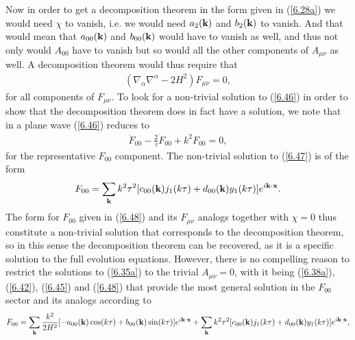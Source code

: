 \documentclass[aps,onecolumn,10pt]{revtex4}
\numberwithin{equation}{section}
\numberwithin{equation}{section}
\begin{document}
Now in order to get a decomposition theorem in the form given in (\ref{6.28a}) we would need $\chi$ to vanish, i.e. we would need $a_2({\bf k})$ and $b_2({\bf k})$ to vanish. And that would mean that $a_{00}({\bf k})$ and $b_{00}({\bf k})$ would have to vanish as well, and thus not only would $A_{00}$ have to vanish but so would all the other components of $A_{\mu\nu}$ as well. A decomposition theorem would thus require that
%
\begin{eqnarray}
(\nabla_{\alpha}\nabla^{\alpha}-2H^2)F_{\mu\nu}=0,
\label{6.46}
\end{eqnarray}
%
for all components of $F_{\mu\nu}$. To look for a non-trivial solution to (\ref{6.46}) in order to show that the decomposition theorem does in fact have a solution, we note that in a plane wave (\ref{6.46}) reduces to 
%
\begin{eqnarray}
\ddot{F}_{00}-\frac{2}{\tau}\dot{F}_{00}+k^2F_{00}=0,
\label{6.47}
\end{eqnarray}
%
for the representative $F_{00}$ component. The non-trivial solution to (\ref{6.47}) is of the form 
%
\begin{eqnarray}
F_{00}=\sum_{\bf k} k^2\tau^2[c_{00}({\bf k})j_1(k\tau)+d_{00} ({\bf k})y_1(k\tau)]e^{i{\bf k}\cdot {\bf x}}.
\label{6.48}
\end{eqnarray}
% 
The form for $F_{00}$ given in (\ref{6.48}) and its $F_{\mu\nu}$ analogs together with $\chi=0$ thus constitute a non-trivial solution that corresponds to the decomposition theorem, so in this sense the decomposition theorem can be recovered, as it is a specific solution to the full evolution equations. However, there is no compelling reason to restrict the solutions to (\ref{6.35a}) to the trivial $A_{\mu\nu}=0$, with it being (\ref{6.38a}), (\ref{6.42}), (\ref{6.45}) and (\ref{6.48}) that provide the most general solution in the $F_{00}$ sector and its analogs according to 
%
\begin{eqnarray}
F_{00}=\sum_{\bf k}\frac{k^2}{2H^2} [-a_{00}({\bf k})\cos(k\tau)+b_{00} ({\bf k})\sin(k\tau)]e^{i{\bf k}\cdot {\bf x}}+\sum_{\bf k} k^2\tau^2[c_{00}({\bf k})j_1(k\tau)+d_{00} ({\bf k})y_1(k\tau)]e^{i{\bf k}\cdot {\bf x}},
\label{6.49}
\end{eqnarray}
% 
\end{document}
